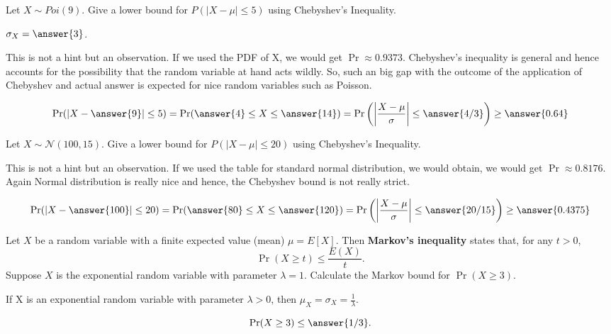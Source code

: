 \documentclass{ximera}
\begin{document}
\begin{problem}
 Let $X \sim Poi(9)$. Give a lower bound for $P( |X -\mu| \leq 5)$ using Chebyshev's Inequality.
\begin{hint}
\item $\sigma_X=\answer{3}$.
\item This is not a hint but an observation. If we used the PDF of X, we would get $\Pr\approx 0.9373$. Chebyshev's inequality is general and hence accounts for the possibility that the random variable at hand acts wildly. So, such an big gap with the outcome of the application of Chebyshev and actual answer is expected for nice random variables such as Poisson. 
\end{hint}
\begin{prompt}
$$\Pr( |X -\answer{9}| \leq 5)=\Pr(\answer{4} \leq X \leq \answer{14})=\Pr\left(\left|\frac{X-\mu}{\sigma}\right| \leq \answer{4/3}\right)\geq \answer{0.64}$$
\end{prompt}
\end{problem}


\begin{problem}
 Let $X \sim \mathcal N (100,15) $. Give a lower bound for $P( |X -\mu| \leq 20)$ using Chebyshev's Inequality.
\begin{hint}
This is not a hint but an observation. If we used the table for standard normal distribution, we would obtain, we would get $\Pr\approx 0.8176$. Again Normal distribution is really nice and hence, the Chebyshev bound is not really strict.
\end{hint}
\begin{prompt}
$$\Pr( |X -\answer{100}| \leq 20)=\Pr(\answer{80} \leq X \leq \answer{120})=\Pr\left(\left|\frac{X-\mu}{\sigma}\right| \leq \answer{20/15}\right)\geq \answer{0.4375}$$
\end{prompt}
\end{problem}

\begin{problem}
Let $X$ be a random variable with a finite expected value (mean) $\mu=E[X]$. Then {\bf Markov's inequality} states that, for any $t>0$, 
$$\Pr(X\geq t)\leq \frac{E(X)}{t}.$$ Suppose $X$ is the exponential random variable with parameter $\lambda=1$. Calculate the Markov bound for $\Pr(X\geq 3)$. 
\begin{hint}
If X is an exponential random variable with parameter $\lambda>0$, then $\mu_X=\sigma_X=\frac{1}{\lambda}$.
\end{hint}
\begin{prompt}%
$$\Pr(X\geq 3)\leq \answer{1/3}.$$

\end{prompt}
\end{problem}
\end{document}
